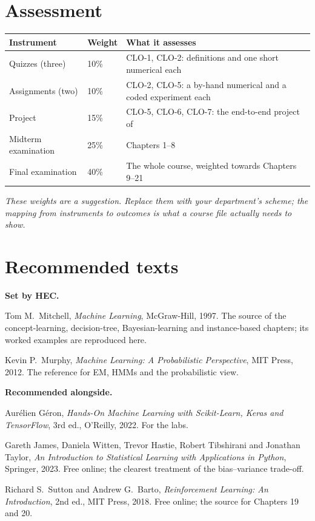 \section*{Assessment}

\begin{longtable}{@{}L{4.4cm}L{1.6cm}L{9.0cm}@{}}
\toprule
{}
\textbf{Instrument} & \textbf{Weight} & \textbf{What it assesses} \\
\midrule
\endhead
Quizzes (three) & 10\% & CLO-1, CLO-2: definitions and one short numerical each \\
Assignments (two) & 10\% & CLO-2, CLO-5: a by-hand numerical and a coded
experiment each \\
Project & 15\% & CLO-5, CLO-6, CLO-7: the end-to-end project of  \\
Midterm examination & 25\% & Chapters 1--8 \\
Final examination & 40\% & The whole course, weighted towards Chapters 9--21 \\
\bottomrule
\end{longtable}

{\small\itshape These weights are a suggestion. Replace them with your
department's scheme; the mapping from instruments to outcomes is what a course
file actually needs to show.}

\section*{Recommended texts}

\textbf{Set by HEC.}
\begin{tightnum}
  \item Tom M.\ Mitchell, \emph{Machine Learning}, McGraw-Hill, 1997. The source
        of the concept-learning, decision-tree, Bayesian-learning and
        instance-based chapters; its worked examples are reproduced here.
  \item Kevin P.\ Murphy, \emph{Machine Learning: A Probabilistic Perspective},
        MIT Press, 2012. The reference for EM, HMMs and the probabilistic view.
\end{tightnum}

\textbf{Recommended alongside.}
\begin{tightnum}
  \setcounter{enumi}{2}
  \item Aur\'elien G\'eron, \emph{Hands-On Machine Learning with Scikit-Learn,
        Keras and TensorFlow}, 3rd ed., O'Reilly, 2022. For the labs.
  \item Gareth James, Daniela Witten, Trevor Hastie, Robert Tibshirani and
        Jonathan Taylor, \emph{An Introduction to Statistical Learning with
        Applications in Python}, Springer, 2023. Free online; the clearest
        treatment of the bias--variance trade-off.
  \item Richard S.\ Sutton and Andrew G.\ Barto, \emph{Reinforcement Learning:
        An Introduction}, 2nd ed., MIT Press, 2018. Free online; the source for
        Chapters 19 and 20.
\end{tightnum}

